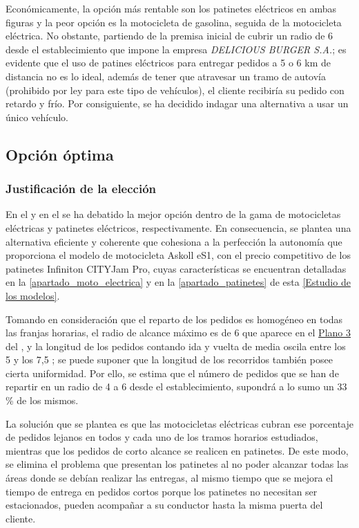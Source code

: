 Económicamente, la opción más rentable son los patinetes eléctricos en ambas figuras y la peor opción es la motocicleta de gasolina, seguida de la motocicleta eléctrica. No obstante, partiendo de la premisa inicial de cubrir un radio de 6  desde el establecimiento que impone la empresa \textit{DELICIOUS BURGER S.A.}; es evidente que el uso de patines eléctricos para entregar pedidos a 5 o 6 km de distancia no es lo ideal, además de tener que atravesar un tramo de autovía (prohibido por ley para este tipo de vehículos), el cliente recibiría su pedido con retardo y frío. Por consiguiente, se ha decidido indagar una alternativa a usar un único vehículo.

\subsection{Opción óptima}
\subsubsection{Justificación de la elección}

En el  y en el  se ha debatido la mejor opción dentro de la gama de motocicletas eléctricas y patinetes eléctricos, respectivamente. En consecuencia, se plantea una alternativa eficiente y coherente que cohesiona a la perfección la autonomía que proporciona el modelo de motocicleta Askoll eS1, con el precio competitivo de los patinetes Infiniton CITYJam Pro, cuyas características se encuentran detalladas en la
\autoref{apartado_moto_electrica} y en la \autoref{apartado_patinetes} de esta \autoref{Estudio de los modelos}.


Tomando en consideración que el reparto de los pedidos es homogéneo en todas las franjas horarias, el radio de alcance máximo es de 6  que aparece en el \hyperref[plano:radio]{\hyperlink{plano:radio}{Plano 3}} del , y la longitud de los pedidos contando ida y vuelta de media oscila entre los 5 y los 7,5 ; se puede suponer que la longitud de los recorridos también posee cierta uniformidad. Por ello, se estima que el número de pedidos que se han de repartir en un radio de 4 a 6  desde el establecimiento, supondrá a lo sumo un 33 \% de los mismos.

La solución que se plantea es que las motocicletas eléctricas cubran ese porcentaje de pedidos lejanos en todos y cada uno de los tramos horarios estudiados, mientras que los pedidos de corto alcance se realicen en patinetes. De este modo, se elimina el problema que presentan los patinetes al no poder alcanzar todas las áreas donde se debían realizar las entregas, al mismo tiempo que se mejora el tiempo de entrega en pedidos cortos porque los patinetes no necesitan ser estacionados, pueden acompañar a su conductor hasta la misma puerta del cliente.

